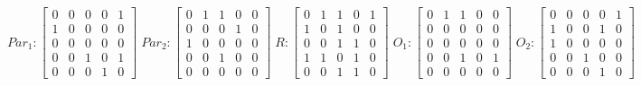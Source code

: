      $$
        Par_{1} : \begin{bmatrix}
            0 & 0 & 0 & 0 & 1 \\
            1 & 0 & 0 & 0 & 0 \\
            0 & 0 & 0 & 0 & 0 \\
			0 & 0 & 1 & 0 & 1 \\
            0 & 0 & 0 & 1 & 0 
        \end{bmatrix}
        \;
        Par_{2} : \begin{bmatrix}
            0 & 1 & 1 & 0 & 0 \\
            0 & 0 & 0 & 1 & 0 \\
            1 & 0 & 0 & 0 & 0 \\
            0 & 0 & 1 & 0 & 0 \\
            0 & 0 & 0 & 0 & 0
        \end{bmatrix}
        \;
        R : \begin{bmatrix}
            0 & 1 & 1 & 0 & 1 \\
            1 & 0 & 1 & 0 & 0 \\
            0 & 0 & 1 & 1 & 0 \\
            1 & 1 & 0 & 1 & 0 \\
            0 & 0 & 1 & 1 & 0
        \end{bmatrix}
        \;
        O_{1} : \begin{bmatrix}
            0 & 1 & 1 & 0 & 0 \\
            0 & 0 & 0 & 0 & 0 \\
            0 & 0 & 0 & 0 & 0 \\
            0 & 0 & 1 & 0 & 1 \\
            0 & 0 & 0 & 0 & 0
        \end{bmatrix}
        \;
        O_{2} : \begin{bmatrix}
            0 & 0 & 0 & 0 & 1 \\
            1 & 0 & 0 & 1 & 0 \\
            1 & 0 & 0 & 0 & 0 \\
            0 & 0 & 1 & 0 & 0 \\
            0 & 0 & 0 & 1 & 0
        \end{bmatrix}
    $$ 

